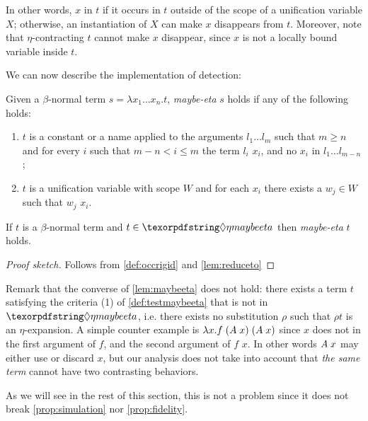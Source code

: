 \documentclass[sigconf,natbib=false,review]{acmart}
\newcommand{\appsep}{\ensuremath{\textcolor{lightgray}{\cdot}}}
\begin{document}
In other words, $x$ \occursrigid in $t$ if it occurs in $t$
outside of the scope of a unification variable $X$; otherwise, an instantiation
of $X$ can make $x$ disappears from $t$.
Moreover, note that $\eta$-contracting $t$ cannot make $x$ disappear, since
$x$ is not a locally bound variable inside $t$.

We can now describe the implementation of \maybeeta detection:

\newcommand{\testmaybeeta}{\emph{maybe-eta}\xspace}
\begin{definition}[\testmaybeeta]\label{def:testmaybeeta}
  Given a $\beta$-normal term
  $s = \lambda x_1 \ldots x_n.t$, \testmaybeeta{} $s$ holds if any
  of the following holds:
  \begin{enumerate}
    \item $t$ is a constant or a name applied to the arguments
      $l_1 \ldots l_m$ such that 
      $m \geq n$ and for every $i$ such that $m - n < i \leq m$
      the term  $l_i$
      \reduceto{} $x_i$, and
      no $x_i$ \occursrigid{} in $l_1 \ldots l_{m-n}$;
    \item $t$ is a
      unification variable with scope $W$ and
      for each $x_i$ there exists a $w_j \in W$ such that $w_j$
      \reduceto{} $x_i$.
  \end{enumerate}
\end{definition}
\begin{lemma}\label{lem:maybeeta}
  If $t$ is a $\beta$-normal term
  and
  $t \in \maybeeta$ then \testmaybeeta{} $t$ holds.
\end{lemma}
\begin{proof}[Proof sketch]
Follows from \cref{def:occrigid} and \cref{lem:reduceto}
\end{proof}

\noindent
Remark that the converse of \cref{lem:maybeeta} does not hold: 
there exists a term $t$ satisfying the criteria (1) of
\cref{def:testmaybeeta} that is not in $\maybeeta$, i.e.
there exists no substitution $\rho$ such that $\rho t$ is an
$\eta$-expansion. A simple counter example is
$\lambda x. f \appsep (A \appsep x) \appsep (A \appsep x)$
since $x$ does not \occurrigid{} in the first argument
of $f$,
and the second argument of $f$ \reduceto{} $x$.
In other words $A \appsep x$
may either use or discard $x$, but our analysis does not
take into account that \emph{the same
term} cannot have two contrasting behaviors.

As we will see in the rest of this section, this is not a problem
since it does not break
\cref{prop:simulation} nor \cref{prop:fidelity}.
\end{document}
